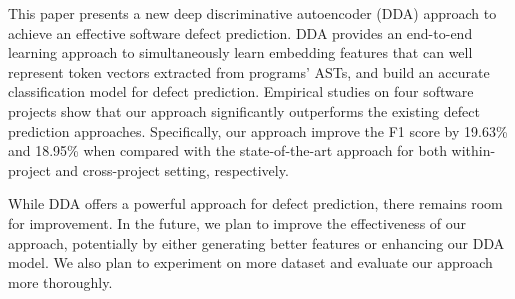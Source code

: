 
This paper presents a new deep discriminative autoencoder (DDA) approach to achieve an effective software defect prediction. DDA provides an end-to-end learning approach to simultaneously learn embedding features that can well represent token vectors extracted from programs' ASTs, and build an accurate classification model for defect prediction. Empirical studies on four software projects show that our approach significantly outperforms the existing defect prediction approaches. Specifically, our approach improve the F1 score by 19.63\% and 18.95\% when compared with the state-of-the-art approach for both within-project and cross-project setting, respectively. 

While DDA offers a powerful approach for defect prediction, there remains room for improvement. In the future, we plan to improve the effectiveness of our approach, potentially by either generating better features or enhancing our DDA model. We also plan to experiment on more dataset and evaluate our approach more thoroughly. 


%

